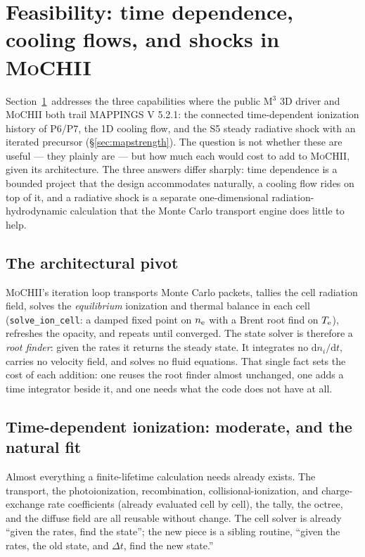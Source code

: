 \documentclass[english,a4paper]{my_memo}
\newcommand{\code}[1]{\texttt{#1}}
\newcommand{\MoCHII}{\textsc{MoCHII}}
\newcommand{\Mthree}{M$^3$}
\newcommand{\Mappings}{MAPPINGS V 5.2.1}
\newcommand{\Te}{T_{\rm e}}
\newcommand{\nelec}{n_{\rm e}}
\begin{document}
\section{Feasibility: time dependence, cooling flows, and shocks in
\texorpdfstring{\MoCHII{}}{MoCHII}}
\label{sec:tdcs}

Section~\ref{sec:tdcs}\ addresses the three capabilities where the public
\Mthree{} 3D driver and \MoCHII{} both trail \Mappings{}: the connected
time-dependent ionization history of P6/P7, the 1D cooling flow, and the
S5 steady radiative shock with an iterated precursor
(\S\ref{sec:mapstrength}).  The question is not whether these are useful
--- they plainly are --- but how much each would cost to add to
\MoCHII{}, given its architecture.  The three answers differ sharply:
time dependence is a bounded project that the design accommodates
naturally, a cooling flow rides on top of it, and a radiative shock is a
separate one-dimensional radiation-hydrodynamic calculation that the
Monte Carlo transport engine does little to help.

\subsection{The architectural pivot}

\MoCHII{}'s iteration loop transports Monte Carlo packets, tallies the
cell radiation field, solves the \emph{equilibrium} ionization and thermal
balance in each cell (\code{solve\_ion\_cell}: a damped fixed point on
$\nelec$ with a Brent root find on $\Te$), refreshes the opacity, and repeats
until converged.  The state solver is therefore a \emph{root finder}:
given the rates it returns the steady state.  It integrates no
$\mathrm{d}n_i/\mathrm{d}t$, carries no velocity field, and solves no
fluid equations.  That single fact sets the cost of each addition: one
reuses the root finder almost unchanged, one adds a time integrator
beside it, and one needs what the code does not have at all.

\subsection{Time-dependent ionization: moderate, and the natural fit}

Almost everything a finite-lifetime calculation needs already exists.  The
transport, the photoionization, recombination, collisional-ionization, and
charge-exchange rate coefficients (already evaluated cell by cell), the
tally, the octree, and the diffuse field are all reusable without change.
The cell solver is already ``given the rates, find the state''; the new
piece is a sibling routine, ``given the rates, the old state, and
$\Delta t$, find the new state.''
\end{document}
